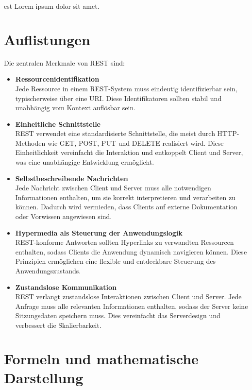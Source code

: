 \documentclass[a4paper, 12pt]{article}
\begin{document}
est Lorem ipsum dolor sit amet.

\section{Auflistungen}

Die zentralen Merkmale von REST sind:

\begin{itemize}
\item \textbf{Ressourcenidentifikation}\\
Jede Ressource in einem REST-System muss eindeutig identifizierbar sein, typischerweise über eine URI. Diese Identifikatoren sollten stabil und unabhängig vom Kontext auflösbar sein.

\item \textbf{Einheitliche Schnittstelle}\\
REST verwendet eine standardisierte Schnittstelle, die meist durch HTTP-Methoden wie GET, POST, PUT und DELETE realisiert wird. Diese Einheitlichkeit vereinfacht die Interaktion und entkoppelt Client und Server, was eine unabhängige Entwicklung ermöglicht.

\item \textbf{Selbstbeschreibende Nachrichten}\\
Jede Nachricht zwischen Client und Server muss alle notwendigen Informationen enthalten, um sie korrekt interpretieren und verarbeiten zu können. Dadurch wird vermieden, dass Clients auf externe Dokumentation oder Vorwissen angewiesen sind.

\item \textbf{Hypermedia als Steuerung der Anwendungslogik}\\
REST-konforme Antworten sollten Hyperlinks zu verwandten Ressourcen enthalten, sodass Clients die Anwendung dynamisch navigieren können. Diese Prinzipien ermöglichen eine flexible und entdeckbare Steuerung des Anwendungszustands.

\item \textbf{Zustandslose Kommunikation}\\
REST verlangt zustandslose Interaktionen zwischen Client und Server. Jede Anfrage muss alle relevanten Informationen enthalten, sodass der Server keine Sitzungsdaten speichern muss. Dies vereinfacht das Serverdesign und verbessert die Skalierbarkeit.
\end{itemize}

\newpage

\section{Formeln und mathematische Darstellung}
\end{document}
